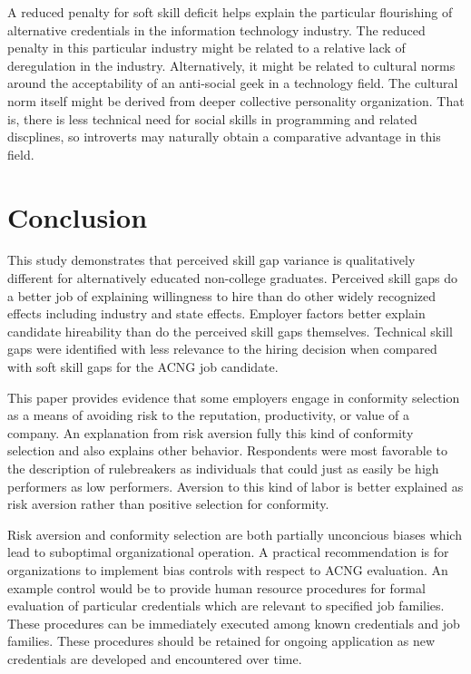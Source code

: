\documentclass[review]{elsarticle}
\begin{document}
A reduced penalty for soft skill deficit helps explain the particular flourishing of alternative credentials in the information technology industry.
The reduced penalty in this particular industry might be related to a relative lack of deregulation in the industry.
Alternatively, it might be related to cultural norms around the acceptability of an anti-social geek in a technology field.
The cultural norm itself might be derived from deeper collective personality organization.
That is, there is less technical need for social skills in programming and related discplines, so introverts may naturally obtain a comparative advantage in this field.

\section{Conclusion}

This study demonstrates that perceived skill gap variance is qualitatively different for alternatively educated non-college graduates.
Perceived skill gaps do a better job of explaining willingness to hire than do other widely recognized effects including industry and state effects.
Employer factors better explain candidate hireability than do the perceived skill gaps themselves.
Technical skill gaps were identified with less relevance to the hiring decision when compared with soft skill gaps for the ACNG job candidate.

This paper provides evidence that some employers engage in conformity selection as a means of avoiding risk to the reputation, productivity, or value of a company.
An explanation from risk aversion fully this kind of conformity selection and also explains other behavior.
Respondents were most favorable to the description of rulebreakers as individuals that could just as easily be high performers as low performers.
Aversion to this kind of labor is better explained as risk aversion rather than positive selection for conformity.

Risk aversion and conformity selection are both partially unconcious biases which lead to suboptimal organizational operation.
A practical recommendation is for organizations to implement bias controls with respect to ACNG evaluation.
An example control would be to provide human resource procedures for formal evaluation of particular credentials which are relevant to specified job families.
These procedures can be immediately executed among known credentials and job families.
These procedures should be retained for ongoing application as new credentials are developed and encountered over time.
\end{document}
